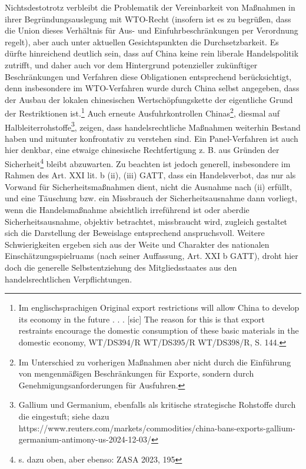 \documentclass[12pt,a4paper,oneside]{book} %
\begin{document}
Nichtsdestotrotz verbleibt die Problematik der Vereinbarkeit von Maßnahmen in ihrer Begründungsauslegung mit WTO-Recht (insofern ist es zu begrüßen, dass die Union dieses Verhältnis für Aus- und Einfuhrbeschränkungen per Verordnung regelt), aber auch unter aktuellen Gesichtspunkten die Durchsetzbarkeit. Es dürfte hinreichend deutlich sein, dass auf China keine rein liberale Handelspolitik zutrifft, und daher auch vor dem Hintergrund potenzieller zukünftiger Beschränkungen und Verfahren diese Obligationen entsprechend berücksichtigt, denn insbesondere im WTO-Verfahren wurde durch China selbst angegeben, dass der Ausbau der lokalen chinesischen Wertschöpfungskette der eigentliche Grund der Restriktionen ist.\footnote{Im englischsprachigen Original \glqq [...]  export restrictions will allow China to develop its economy in the future . . . [sic] The reason for this is that export restraints encourage the domestic consumption of these basic materials in the domestic economy\grqq, WT/DS394/R WT/DS395/R WT/DS398/R, S. 144.} 
Auch erneute Ausfuhrkontrollen Chinas\footnote{Im Unterschied zu vorherigen Maßnahmen aber nicht durch die Einführung von mengenmäßigen Beschränkungen für Exporte, sondern durch Genehmigungsanforderungen für Ausfuhren.}, diesmal auf Halbleiterrohstoffe\footnote{Gallium und Germanium, ebenfalls als kritische strategische Rohstoffe durch die eingestuft; siehe dazu https://www.reuters.com/markets/commodities/china-bans-exports-gallium-germanium-antimony-us-2024-12-03/}, zeigen, dass handelsrechtliche Maßnahmen weiterhin Bestand haben und mitunter konfrontativ zu verstehen sind.\autocite{ZASA 2023, 195} Ein Panel-Verfahren ist auch hier denkbar, eine etwaige chinesische Rechtfertigung z. B. aus Gründen der Sicherheit\footnote{s. dazu oben, aber ebenso: ZASA 2023, 195} bleibt abzuwarten. Zu beachten ist jedoch generell, insbesondere im Rahmen des Art. XXI lit. b (ii), (iii) GATT, dass ein Handelsverbot, das nur als Vorwand für Sicherheitsmaßnahmen dient, nicht die Ausnahme nach (ii) erfüllt, und eine Täuschung bzw. ein Missbrauch der Sicherheitsausnahme dann vorliegt, wenn  die Handelsmaßnahme absichtlich irreführend ist oder aberdie Sicherheitsausnahme, objektiv betrachtet, missbraucht wird, zugleich gestaltet sich die Darstellung der Beweislage entsprechend anspruchsvoll.\autocites{ZASA 2023, 195, 197}{Ikeda, K.: A Proposed Interpretation of GATT Article XXI (b) (ii) in Light of its Implications for Export Control} Weitere Schwierigkeiten ergeben sich aus der Weite und Charakter des nationalen Einschätzungsspielruams (\glqq nach seiner Auffassung\grqq, Art. XXI b GATT), droht hier doch die generelle Selbstentziehung des Mitgliedsstaates aus den handelsrechtlichen Verpflichtungen.\autocite[Ausführlich]{Herdegen, Internationales Wirtschaftsrecht, Rn. 81ff.}
\end{document}
